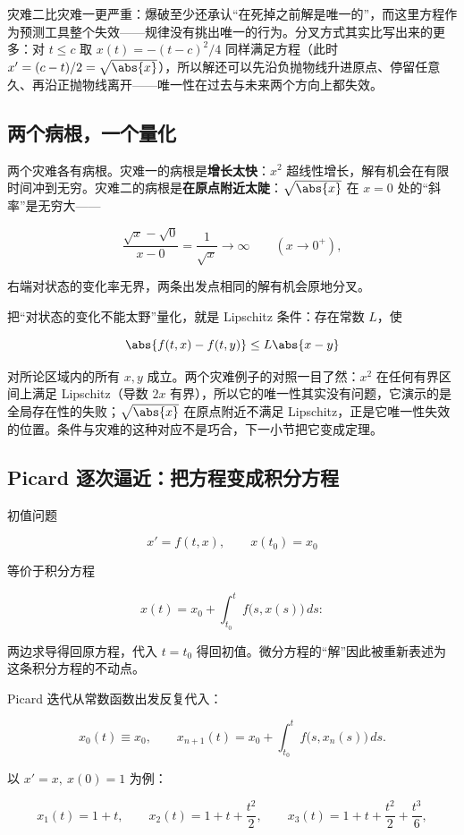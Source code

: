 灾难二比灾难一更严重：爆破至少还承认``在死掉之前解是唯一的''，而这里方程作为预测工具整个失效——规律没有挑出唯一的行为。分叉方式其实比写出来的更多：对 \(t\le c\) 取 \(x(t)=-(t-c)^2/4\) 同样满足方程（此时 \(x'=(c-t)/2=\sqrt{\abs{x}}\)），所以解还可以先沿负抛物线升进原点、停留任意久、再沿正抛物线离开——唯一性在过去与未来两个方向上都失效。

\subsection{两个病根，一个量化}

两个灾难各有病根。灾难一的病根是\textbf{增长太快}：\(x^2\) 超线性增长，解有机会在有限时间冲到无穷。灾难二的病根是\textbf{在原点附近太陡}：\(\sqrt{\abs{x}}\) 在 \(x=0\) 处的``斜率''是无穷大——

\[
\frac{\sqrt{x}-\sqrt{0}}{x-0}=\frac{1}{\sqrt{x}}\to\infty
\qquad (x\to0^{+}),
\]

右端对状态的变化率无界，两条出发点相同的解有机会原地分叉。

把``对状态的变化不能太野''量化，就是 Lipschitz 条件：存在常数 \(L\)，使

\[
\abs{f(t,x)-f(t,y)}\le L\abs{x-y}
\]

对所论区域内的所有 \(x,y\) 成立。两个灾难例子的对照一目了然：\(x^2\) 在任何有界区间上满足 Lipschitz（导数 \(2x\) 有界），所以它的唯一性其实没有问题，它演示的是全局存在性的失败；\(\sqrt{\abs{x}}\) 在原点附近不满足 Lipschitz，正是它唯一性失效的位置。条件与灾难的这种对应不是巧合，下一小节把它变成定理。

\subsection{Picard 逐次逼近：把方程变成积分方程}

初值问题

\[
x'=f(t,x),
\qquad
x(t_0)=x_0
\]

等价于积分方程

\[
x(t)=x_0+\int_{t_0}^{t}f\bigl(s,x(s)\bigr)\,ds:
\]

两边求导得回原方程，代入 \(t=t_0\) 得回初值。微分方程的``解''因此被重新表述为这条积分方程的不动点。

Picard 迭代从常数函数出发反复代入：

\[
x_0(t)\equiv x_0,
\qquad
x_{n+1}(t)=x_0+\int_{t_0}^{t}f\bigl(s,x_n(s)\bigr)\,ds.
\]

以 \(x'=x,\ x(0)=1\) 为例：

\[
x_1(t)=1+t,
\qquad
x_2(t)=1+t+\frac{t^2}{2},
\qquad
x_3(t)=1+t+\frac{t^2}{2}+\frac{t^3}{6},
\]

